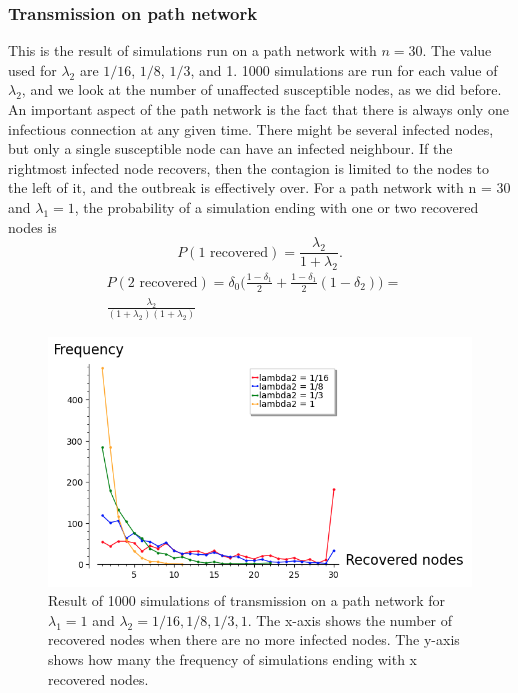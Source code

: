 \documentclass[12pt]{article} %
\numberwithin{equation}{section}
\begin{document}
\subsubsection{Transmission on path network}
This is the result of simulations run on a path network with $n=30$. The value used for $\lambda_2$ are $1/16$, $1/8$, $1/3$, and 1. 1000 simulations are run for each value of $\lambda_2$, and we look at the number of unaffected susceptible nodes, as we did before. An important aspect of the path network is the fact that there is always only one infectious connection at any given time. There might be several infected nodes, but only a single susceptible node can have an infected neighbour. If the rightmost infected node recovers, then the contagion is limited to the nodes to the left of it, and the outbreak is effectively over. For a path network with n = 30 and $\lambda_1 = 1$, the probability of a simulation ending with one or two recovered nodes is
\begin{equation}\label{bara1path}
    P(\text{1 recovered}) = \frac{\lambda_2}{1+\lambda_2}.
\end{equation}
\begin{align}\label{bara2path}
    P(\text{2 recovered}) = \delta_0\Big(\frac{1-\delta_1}{2}+\frac{1-\delta_1}{2}(1-\delta_2)\Big) = & \\ \frac{\lambda_2}{(1+\lambda_2)(1+\lambda_2)}
\end{align}
\begin{figure}
    \centering
    \includegraphics[scale=0.7]{pathSIR.png}   
    \caption{Result of 1000 simulations of transmission on a path network for $\lambda_1 = 1$ and $\lambda_2 = 1/16, 1/8, 1/3, 1$. The x-axis shows the number of recovered nodes when there are no more infected nodes. The y-axis shows how many the frequency of simulations ending with x recovered nodes.}
    \label{pathsirplot}
\end{figure}
\end{document}
